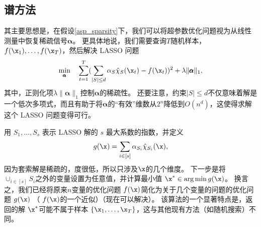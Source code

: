 \subsection{
	谱方法
	} 

其主要思想是，在假设\ref{asp_sparsity}下，我们可以将超参数优化问题视为从线性测量中恢复稀疏信号$\pmb{\alpha}$。
更具体地说，我们需要查询$T$随机样本，$f(\x_1), \dots, f(\x_T)$，然后解决 LASSO 问题
\begin{equation}
\label{lasso_hyp}
\min_{\pmb{\alpha}} \quad \sum_{t=1}^{T} (\sum_{|S| \le d} \alpha_S \hat{\chi}_S (\x_t) - f(\x_t) )^2 + \lambda \|\pmb{\alpha}\|_1,
\end{equation}
其中，正则化项$\lambda \|\pmb{\alpha}\|_1$控制$\pmb{\alpha}$的稀疏性。
还要注意，约束$|S| \le d$不仅意味着解是一个低次多项式，而且有助于将$\pmb{\alpha}$的“有效”维数从$2^n$降低到$O(n^d)$，这使得求解这个 LASSO 问题变得可行。

用 $S_1, \dots, S_s$ 表示 LASSO 解的 $s$ 最大系数的指数，并定义
$$
g(\x) = \sum_{i \in [s]} \alpha_{S_i} \hat{\chi}_{S_i} (\x),
$$
因为套索解是稀疏的，度很低，所以只涉及$\x$的几个维度。
下一步是将 $\cup_{i\in [s]} S_i$之外的变量设置为任意值，并计算最小值 $\x^{*} \in \arg \min g(\x)$。
换言之，我们已经将原来$n$变量的优化问题 $f(\x)$简化为关于几个变量的问题的优化问题 $g(\x)$ （  $f(\x)$的一个近似）（现在可以解决）。
该算法的一个显著特点是，返回的解 $\x^{*}$可能不属于样本 $\{\x_1, \dots, \x_T\}$，这与其他现有方法（如随机搜索）不同。


